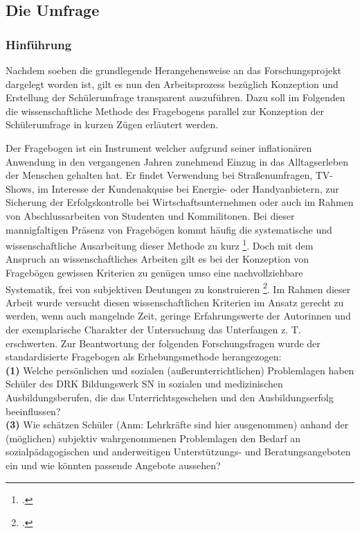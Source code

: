\subsection{Die Umfrage}
\label{sec:DieUmfrage}

\subsubsection{Hinführung}
\label{sec:Hinführung}

Nachdem soeben die grundlegende Herangehensweise an das Forschungsprojekt dargelegt worden ist, gilt es nun den Arbeitsprozess bezüglich Konzeption und Erstellung der Schülerumfrage transparent auszuführen. Dazu soll im Folgenden die wissenschaftliche Methode des Fragebogens parallel zur Konzeption der Schülerumfrage in kurzen Zügen erläutert werden.

Der Fragebogen ist ein Instrument welcher aufgrund seiner inflationären Anwendung in den vergangenen Jahren zunehmend Einzug in das Alltagserleben der Menschen gehalten hat. Er findet Verwendung bei Straßenumfragen, TV-Shows, im Interesse der Kundenakquise bei Energie- oder Handyanbietern, zur Sicherung der Erfolgskontrolle bei Wirtschaftsunternehmen oder auch im Rahmen von Abschlussarbeiten von Studenten und Kommilitonen. Bei dieser mannigfaltigen Präsenz von Fragebögen kommt häufig die systematische und wissenschaftliche Ausarbeitung dieser Methode zu kurz \footcite[vgl.][11]{Kallus2010}. Doch mit dem Anspruch an wissenschaftliches Arbeiten gilt es bei der Konzeption von Fragebögen gewissen Kriterien zu genügen umso eine nachvollziehbare Systematik, frei von subjektiven Deutungen zu konstruieren \footcite[vgl.][9]{Mayer2013}. Im Rahmen dieser Arbeit wurde versucht diesen wissenschaftlichen Kriterien im Ansatz gerecht zu werden, wenn auch mangelnde Zeit, geringe Erfahrungswerte der Autorinnen und der exemplarische Charakter der Untersuchung das Unterfangen z. T. erschwerten. Zur Beantwortung der folgenden Forschungsfragen wurde der standardisierte Fragebogen als Erhebungsmethode herangezogen:\\
 

\noindent
\textbf{(1)} Welche persönlichen und sozialen (außerunterrichtlichen) Problemlagen haben Schüler des DRK Bildungswerk SN in sozialen und medizinischen Ausbildungsberufen, die das Unterrichtsgeschehen und den Ausbildungserfolg beeinflussen?\\

\noindent
\textbf{(3)} Wie schätzen Schüler (Anm: Lehrkräfte sind hier ausgenommen) anhand der (möglichen) subjektiv wahrgenommenen Problemlagen den Bedarf an sozialpädagogischen und anderweitigen Unterstützungs- und Beratungsangeboten ein und wie könnten passende Angebote aussehen?\\

